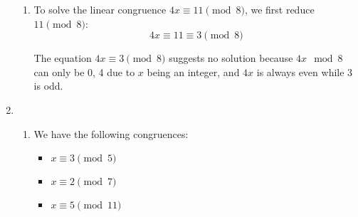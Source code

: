 \documentclass[a4paper]{article}
\begin{document}
\begin{enumerate}
\begin{enumerate}
            \item To solve the linear congruence \(4x \equiv 11 \pmod{8}\), we first reduce \(11 \pmod{8}\):
            \[
                4x \equiv 11 \equiv 3 \pmod{8}
            \]

            The equation \(4x \equiv 3 \pmod{8}\) suggests no solution because \(4x \mod 8\) can only be 0, 4 due to \(x\) being an integer, and \(4x\) is always even while 3 is odd.
        \end{enumerate}


        \newpage
        \item \begin{enumerate}
            \item We have the following congruences:
            \begin{itemize}
                \item \(x \equiv 3 \pmod{5}\)
                \item \(x \equiv 2 \pmod{7}\)
                \item \(x \equiv 5 \pmod{11}\)
            \end{itemize}


\end{enumerate}
\end{enumerate}
\end{document}
